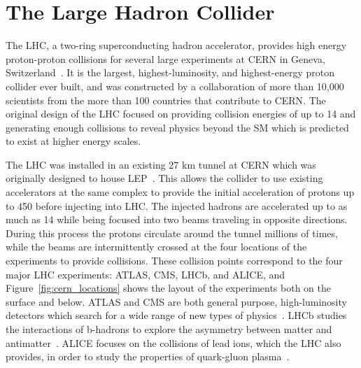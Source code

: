 \chapter{The Large Hadron Collider}

\label{ch:lhc}

The \ac{LHC}, a two-ring superconducting hadron accelerator, provides high energy proton-proton collisions for several large experiments at \ac{CERN} in Geneva, Switzerland~\cite{lhc_machine, lhc_guide}. 
It is the largest, highest-luminosity, and highest-energy proton collider ever built, and was constructed by a collaboration of more than 10,000 scientists from the more than 100 countries that contribute to \ac{CERN}.
The original design of the \ac{LHC} focused on providing collision energies of up to 14 \TeV and generating enough collisions to reveal physics beyond the \ac{SM} which is predicted to exist at higher energy scales.

The \ac{LHC} was installed in an existing 27 km tunnel at \ac{CERN} which was originally designed to house \ac{LEP}~\cite{lep_tdr}.
This allows the collider to use existing accelerators at the same complex to provide the initial acceleration of protons up to 450 \GeV before injecting into \ac{LHC}.
The injected hadrons are accelerated up to as much as 14 \TeV while being focused into two beams traveling in opposite directions.
During this process the protons circulate around the tunnel millions of times, while the beams are intermittently crossed at the four locations of the experiments to provide collisions.
These collision points correspond to the four major \ac{LHC} experiments: \ac{ATLAS}, \ac{CMS}, \ac{LHCb}, and \ac{ALICE}, and Figure~\ref{fig:cern_locations} shows the layout of the experiments both on the surface and below.
\ac{ATLAS} and \ac{CMS} are both general purpose, high-luminosity detectors which search for a wide range of new types of physics~\cite{atlas_experiment, cms_experiment}.
\ac{LHCb} studies the interactions of b-hadrons to explore the asymmetry between matter and antimatter~\cite{lhcb_experiment}.
\ac{ALICE} focuses on the collisions of lead ions, which the \ac{LHC} also provides, in order to study the properties of quark-gluon plasma~\cite{alice_experiment}.


